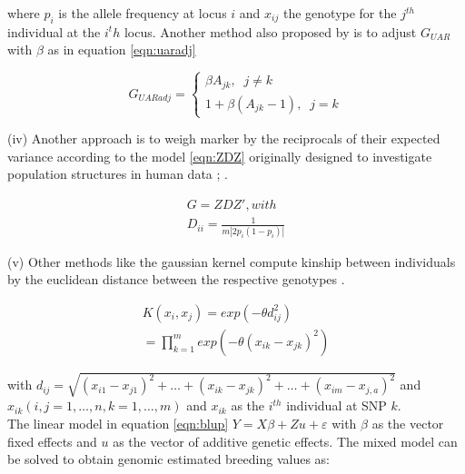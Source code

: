 where $p_i$ is the allele frequency at locus $i$ and $x_{ij}$ the genotype for the $j^{th}$ individual at the
$i^th$ locus. Another method also proposed by \cite{yang2010common} is to adjust $G_{UAR}$ with $\beta$ as in
equation \ref{eqn:uaradj}

\begin{equation}
 G_{UARadj} = \left\{
  \!\begin{aligned}
   \beta A_{jk}, \;\; j \ne k \\
   1 + \beta (A_{jk}-1 ), \;\; j = k   
  \end{aligned}
  \right.
 \label{eqn:uaradj}
\end{equation}

(iv) Another approach is to weigh marker by the reciprocals of their expected variance according to the model
\ref{eqn:ZDZ} originally designed to investigate population structures in human data
\cite{leutenegger2003estimation}; \cite{amin2007genomic}.

\begin{equation}
 \!\begin{aligned}
  G = ZDZ' , with \\
  D_{ii} = \frac{1}{m | 2p_i(1-p_i) | }
 \end{aligned}
 \label{eqn:ZDZ}
\end{equation}


(v) Other methods like the gaussian kernel compute kinship between individuals by the euclidean distance
between the respective genotypes \cite{morota2014kernel}.

\begin{equation}
 \!\begin{aligned}
  K(x_i,x_j) = exp (- \theta d_{ij}^2) \\
  = \prod_{k=1}^m exp (- \theta(x_{ik} - x_{jk})^2)
 \end{aligned}
 \label{eqn:gauss}
\end{equation}

with $d_{ij} = \sqrt{(x_{i1} - x_{j1})^2 + \dots + (x_{ik} - x_{jk})^2 + \dots + (x_{im} - x_{j,a})^2 }$ and
$ x_{ik}(i,j = 1, \dots , n,k = 1, \dots , m)$ and $x_{ik}$ as the $i^{th}$ individual at SNP $k$. \\


The linear model in equation \ref{eqn:blup} $Y = X \beta + Zu + \varepsilon$ with $\beta$ as the vector fixed
effects and $u$ as the vector of additive genetic effects.
The mixed model can be solved to obtain genomic estimated breeding values as:


